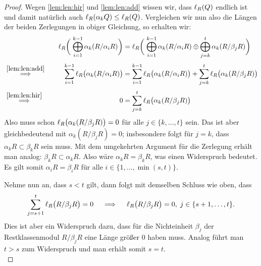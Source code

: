 \begin{proof}
    Wegen \cref{lem:len:hir} und \cref{lem:len:add}
    wissen wir, dass $\operatorname{\ell}_{R}(Q)$ endlich ist und damit natürlich auch
    $\operatorname{\ell}_{R}(\alpha_k Q) \leq \operatorname{\ell}_{R}(Q)$. Vergleichen wir nun also die Längen der
    beiden Zerlegungen in obiger Gleichung, so erhalten wir:
    \begin{align*}
        & &
        \operatorname{\ell}_{R}\biggl(\; \bigoplus_{i=1}^{k-1} \alpha_k (R/\alpha_i R) \biggr)
        &= \operatorname{\ell}_{R}\biggl(\; \bigoplus_{i=1}^{k-1} \alpha_k (R/\alpha_i R) \oplus
                         \bigoplus_{j=k}^{t}   \alpha_k (R/\beta_j R) \biggr)
        \\[1mm]
        &\overset{ \ref{lem:len:add} }{\implies}\quad &
        \sum_{i=1}^{k-1} \operatorname{\ell}_{R}\bigl(\alpha_k (R/\alpha_i R)\bigr)
        &= \sum_{i=1}^{k-1} \operatorname{\ell}_{R}\bigl(\alpha_k (R/\alpha_i R)\bigr)
         + \sum_{j=k}^{t}   \operatorname{\ell}_{R}\bigl(\alpha_k (R/\beta_j R) \bigr)
        \\[1mm]
        &\overset{ \ref{lem:len:hir} }{\implies}\quad &
        0 &= \sum_{j=k}^{t} \operatorname{\ell}_{R}\bigl(\alpha_k (R/\beta_j R) \bigr)
    \end{align*}
    Also muss schon $\operatorname{\ell}_{R}\bigl(\alpha_k (R/\beta_j R) \bigr) = 0$ für alle
    $j\in\{k,\ldots,t\}$ sein. Das ist aber gleichbedeutend mit 
    $\alpha_k (R/\beta_j R) = 0$; insbesondere folgt für $j=k$, dass $\alpha_k R \subset
    \beta_k R$ sein muss. Mit dem umgekehrten Argument für die Zerlegung erhält
    man analog: $\beta_k R \subset \alpha_k R$. 
    Also wäre $\alpha_k R = \beta_k R$, was einen Widerspruch bedeutet. Es
    gilt somit $\alpha_i R = \beta_i R$ für alle $i\in\{1,\ldots,\min(s,t)\}$.
    
    Nehme nun an, dass $s<t$ gilt, dann folgt mit demselben Schluss wie oben,
    dass
    \[ \sum_{j=s+1}^{t} \operatorname{\ell}_{R}\bigl( R/\beta_j R \bigr) = 0   \quad
        \implies\quad \operatorname{\ell}_{R}\bigl(R/\beta_j R\bigr) = 0,\; j\in\{s+1,\ldots,t\} 
    . \]
    Dies ist aber ein Widerspruch dazu, dass für die Nichteinheit $\beta_j$ der
    Restklassenmodul $R/\beta_j R$ eine Länge größer $0$ haben muss.
    Analog führt man $t>s$ zum Widerspruch und man erhält somit $s=t$.
    \\
\end{proof}

